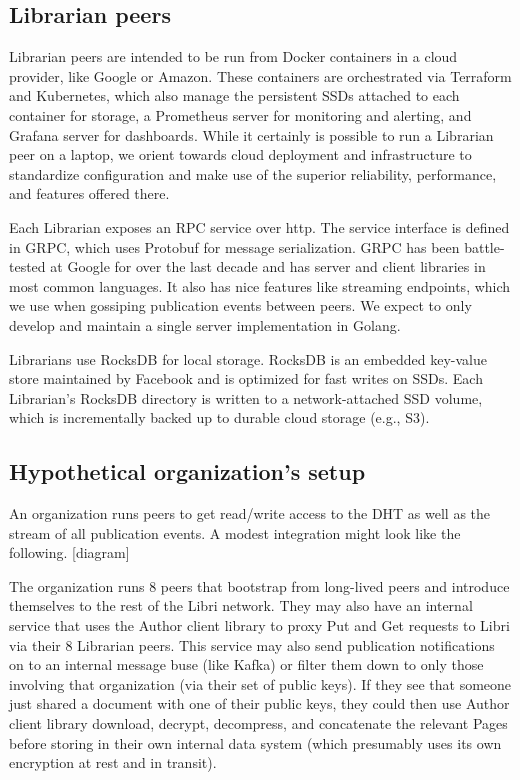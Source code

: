 \documentclass[10pt]{article}
\begin{document}
\subsection{Librarian peers}
Librarian peers are intended to be run from Docker containers in a cloud provider, like Google or Amazon. These containers are orchestrated via Terraform and Kubernetes, which also manage the persistent SSDs attached to each container for storage, a Prometheus server for monitoring and alerting, and Grafana server for dashboards. While it certainly is possible to run a Librarian peer on a laptop, we orient towards cloud deployment and infrastructure to standardize configuration and make use of the superior reliability, performance, and features offered there. 

Each Librarian exposes an RPC service over http. The service interface is defined in GRPC, which uses Protobuf for message serialization. GRPC has been battle-tested at Google for over the last decade and has server and client libraries in most common languages. It also has nice features like streaming endpoints, which we use when gossiping publication events between peers. We expect to only develop and maintain a single server implementation in Golang. 

Librarians use RocksDB for local storage. RocksDB is an embedded key-value store maintained by Facebook and is optimized for fast writes on SSDs. Each Librarian's RocksDB directory is written to a network-attached SSD volume, which is incrementally backed up to durable cloud storage (e.g., S3). 


\subsection{Hypothetical organization's setup}

An organization runs peers to get read/write access to the DHT as well as the stream of all publication events. A modest integration might look like the following. [diagram]

The organization runs 8 peers that bootstrap from long-lived peers and introduce themselves to the rest of the Libri network. They may also have an internal service that uses the Author client library to proxy Put and Get requests to Libri via their 8 Librarian peers. This service may also send publication notifications on to an internal message buse (like Kafka) or filter them down to only those involving that organization (via their set of public keys). If they see that someone just shared a document with one of their public keys, they could then use Author client library download, decrypt, decompress, and concatenate the relevant Pages before storing in their own internal data system (which presumably uses its own encryption at rest and in transit).
\end{document}
